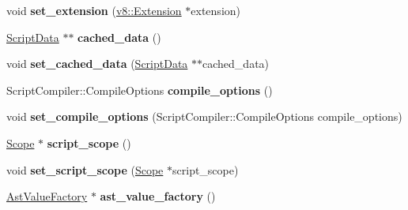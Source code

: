 \begin{DoxyCompactItemize}
\item 
void {\bfseries set\+\_\+extension} (\hyperlink{classv8_1_1_extension}{v8\+::\+Extension} $\ast$extension)\hypertarget{classv8_1_1internal_1_1_parse_info_a34ac588ed941a292bbff1ac5778fd4e2}{}\label{classv8_1_1internal_1_1_parse_info_a34ac588ed941a292bbff1ac5778fd4e2}

\item 
\hyperlink{classv8_1_1internal_1_1_script_data}{Script\+Data} $\ast$$\ast$ {\bfseries cached\+\_\+data} ()\hypertarget{classv8_1_1internal_1_1_parse_info_a3ad5a1be56e55df7fdae0f72f0c93cca}{}\label{classv8_1_1internal_1_1_parse_info_a3ad5a1be56e55df7fdae0f72f0c93cca}

\item 
void {\bfseries set\+\_\+cached\+\_\+data} (\hyperlink{classv8_1_1internal_1_1_script_data}{Script\+Data} $\ast$$\ast$cached\+\_\+data)\hypertarget{classv8_1_1internal_1_1_parse_info_a839f647bdbb87e3cd52b61ad3b142d6b}{}\label{classv8_1_1internal_1_1_parse_info_a839f647bdbb87e3cd52b61ad3b142d6b}

\item 
Script\+Compiler\+::\+Compile\+Options {\bfseries compile\+\_\+options} ()\hypertarget{classv8_1_1internal_1_1_parse_info_a271b406d602d4cd193180a56fb7880fa}{}\label{classv8_1_1internal_1_1_parse_info_a271b406d602d4cd193180a56fb7880fa}

\item 
void {\bfseries set\+\_\+compile\+\_\+options} (Script\+Compiler\+::\+Compile\+Options compile\+\_\+options)\hypertarget{classv8_1_1internal_1_1_parse_info_a1d8fe2e04938fa5765cd7a76202e246c}{}\label{classv8_1_1internal_1_1_parse_info_a1d8fe2e04938fa5765cd7a76202e246c}

\item 
\hyperlink{classv8_1_1internal_1_1_scope}{Scope} $\ast$ {\bfseries script\+\_\+scope} ()\hypertarget{classv8_1_1internal_1_1_parse_info_a6541f179c487c0979aff45239261aaf1}{}\label{classv8_1_1internal_1_1_parse_info_a6541f179c487c0979aff45239261aaf1}

\item 
void {\bfseries set\+\_\+script\+\_\+scope} (\hyperlink{classv8_1_1internal_1_1_scope}{Scope} $\ast$script\+\_\+scope)\hypertarget{classv8_1_1internal_1_1_parse_info_a82e036b7fb1bfbc870aa409e6f001f8f}{}\label{classv8_1_1internal_1_1_parse_info_a82e036b7fb1bfbc870aa409e6f001f8f}

\item 
\hyperlink{classv8_1_1internal_1_1_ast_value_factory}{Ast\+Value\+Factory} $\ast$ {\bfseries ast\+\_\+value\+\_\+factory} ()\hypertarget{classv8_1_1internal_1_1_parse_info_aba5a76902b5b4616e1317cf21ea9e178}{}\label{classv8_1_1internal_1_1_parse_info_aba5a76902b5b4616e1317cf21ea9e178}


\end{DoxyCompactItemize}

